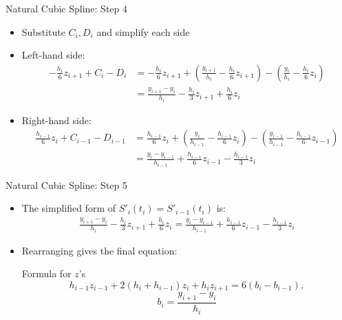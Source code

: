 \documentclass[10pt]{beamer}
\begin{document}
\begin{frame}{Natural Cubic Spline: Step 4}
\begin{itemize}

\item Substitute $C_i, D_i$ and simplify each side

\item Left-hand side:
\begin{align*}
-\frac{h_i}{6}z_{i+1} + C_i - D_i
&= -\frac{h_i}{6}z_{i+1}
+ \left(\frac{y_{i+1}}{h_i} - \frac{h_i}{6}z_{i+1}\right)
- \left(\frac{y_i}{h_i} - \frac{h_i}{6}z_i\right) \\
&= \frac{y_{i+1}-y_i}{h_i}
- \frac{h_i}{3}z_{i+1}
+ \frac{h_i}{6}z_i
\end{align*}

\item Right-hand side:
\begin{align*}
\frac{h_{i-1}}{6}z_i + C_{i-1} - D_{i-1}
&= \frac{h_{i-1}}{6}z_i
+ \left(\frac{y_i}{h_{i-1}} - \frac{h_{i-1}}{6}z_i\right)
- \left(\frac{y_{i-1}}{h_{i-1}} - \frac{h_{i-1}}{6}z_{i-1}\right) \\
&= \frac{y_i - y_{i-1}}{h_{i-1}}
+ \frac{h_{i-1}}{6}z_{i-1}
- \frac{h_{i-1}}{3}z_i
\end{align*}

\end{itemize}
\end{frame}

\begin{frame}{Natural Cubic Spline: Step 5}
\begin{itemize}

\item The simplified form of $S'_i(t_i) = S'_{i-1}(t_i)$ is:
\begin{align*}
\frac{y_{i+1}-y_i}{h_i}
- \frac{h_i}{3}z_{i+1}
+ \frac{h_i}{6}z_i
=
\frac{y_i - y_{i-1}}{h_{i-1}}
+ \frac{h_{i-1}}{6}z_{i-1}
- \frac{h_{i-1}}{3}z_i
\end{align*}

\item Rearranging gives the final equation:

\begin{block}{Formula for $z$'s}
\begin{equation*}
h_{i-1}z_{i-1} + 2(h_i+h_{i-1})z_i + h_i z_{i+1}
= 6(b_i - b_{i-1}),
\end{equation*}
\[
b_i = \frac{y_{i+1}-y_i}{h_i}
\]
\end{block}

\end{itemize}
\end{frame}
\end{document}
